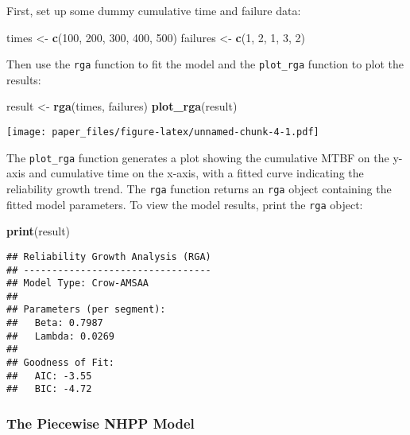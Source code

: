 \documentclass[
]{article}
\newenvironment{Shaded}{\begin{snugshade}}{\end{snugshade}}
\newcommand{\DecValTok}[1]{\textcolor[rgb]{0.00,0.00,0.81}{#1}}
\newcommand{\FunctionTok}[1]{\textcolor[rgb]{0.13,0.29,0.53}{\textbf{#1}}}
\newcommand{\NormalTok}[1]{#1}
\newcommand{\OtherTok}[1]{\textcolor[rgb]{0.56,0.35,0.01}{#1}}
\begin{document}
First, set up some dummy cumulative time and failure data:

\begin{Shaded}
\begin{Highlighting}[]
\NormalTok{times }\OtherTok{\textless{}{-}} \FunctionTok{c}\NormalTok{(}\DecValTok{100}\NormalTok{, }\DecValTok{200}\NormalTok{, }\DecValTok{300}\NormalTok{, }\DecValTok{400}\NormalTok{, }\DecValTok{500}\NormalTok{)}
\NormalTok{failures }\OtherTok{\textless{}{-}} \FunctionTok{c}\NormalTok{(}\DecValTok{1}\NormalTok{, }\DecValTok{2}\NormalTok{, }\DecValTok{1}\NormalTok{, }\DecValTok{3}\NormalTok{, }\DecValTok{2}\NormalTok{)}
\end{Highlighting}
\end{Shaded}

Then use the \texttt{rga} function to fit the model and the
\texttt{plot\_rga} function to plot the results:

\begin{Shaded}
\begin{Highlighting}[]
\NormalTok{result }\OtherTok{\textless{}{-}} \FunctionTok{rga}\NormalTok{(times, failures)}
\FunctionTok{plot\_rga}\NormalTok{(result)}
\end{Highlighting}
\end{Shaded}

\texttt{[image: paper\_files/figure-latex/unnamed-chunk-4-1.pdf]}

The \texttt{plot\_rga} function generates a plot showing the cumulative
MTBF on the y-axis and cumulative time on the x-axis, with a fitted
curve indicating the reliability growth trend. The \texttt{rga} function
returns an \texttt{rga} object containing the fitted model parameters.
To view the model results, print the \texttt{rga} object:

\begin{Shaded}
\begin{Highlighting}[]
\FunctionTok{print}\NormalTok{(result)}
\end{Highlighting}
\end{Shaded}

\begin{verbatim}
## Reliability Growth Analysis (RGA)
## ---------------------------------
## Model Type: Crow-AMSAA 
## 
## Parameters (per segment):
##   Beta: 0.7987
##   Lambda: 0.0269
## 
## Goodness of Fit:
##   AIC: -3.55
##   BIC: -4.72
\end{verbatim}

\subsubsection{The Piecewise NHPP Model}\label{the-piecewise-nhpp-model}
\end{document}
